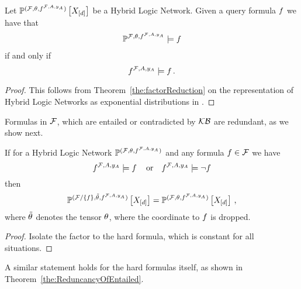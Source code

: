 \begin{theorem}
    \label{the:hlnEntailmentReduction}
    Let $\mathbb{P}^{(\mathcal{F},\theta,f^{\mathcal{F},A,y_{A}})}\left[X_{[d]}\right]$ be a Hybrid Logic Network.
    Given a query formula $f$ we have that
    \begin{align*}
        \mathbb{P}^{\mathcal{F},\theta,f^{\mathcal{F},A,y_{A}}} \models f
    \end{align*}
    if and only if
    \[ f^{\mathcal{F},A,y_{A}} \models f \, . \]
\end{theorem}
\begin{proof}
    This follows from Theorem~\ref{the:factorReduction} on the representation of Hybrid Logic Networks as exponential distributions in .
\end{proof}


Formulas in $\mathcal{F}$, which are entailed or contradicted by $\mathcal{KB}$ are redundant, as we show next.

\begin{theorem}%
    If for a Hybrid Logic Network $\mathbb{P}^{(\mathcal{F},\theta,f^{\mathcal{F},A,y_{A}})}$ and any formula $f\in\mathcal{F}$ we have
    \[ f^{\mathcal{F},A,y_{A}} \models f \, \quad \text{or} \quad f^{\mathcal{F},A,y_{A}} \models \lnot f \]
    then
    \[ \mathbb{P}^{(\mathcal{F}/\{f\},\tilde{\theta},f^{\mathcal{F},A,y_{A}})}\left[X_{[d]}\right] =  \mathbb{P}^{(\mathcal{F},\theta,f^{\mathcal{F},A,y_{A}})}\left[X_{[d]}\right]  \, , \]
    where $\tilde{\theta}$ denotes the tensor $\theta$, where the coordinate to $f$ is dropped. %
\end{theorem}
\begin{proof}
    Isolate the factor to the hard formula, which is constant for all situations.
\end{proof}

A similar statement holds for the hard formulas itself, as shown in Theorem~\ref{the:ReduncancyOfEntailed}.


